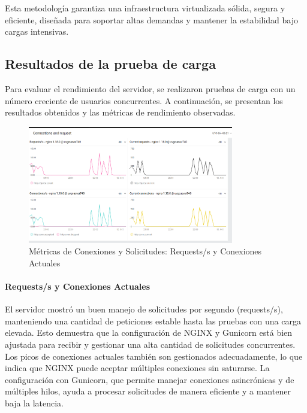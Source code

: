 Esta metodología garantiza una infraestructura virtualizada sólida, segura y eficiente, diseñada para soportar altas demandas y mantener la estabilidad bajo cargas intensivas.

\subsection{Resultados de la prueba de carga}

Para evaluar el rendimiento del servidor, se realizaron pruebas de carga con un número creciente de usuarios concurrentes. A continuación, se presentan los resultados obtenidos y las métricas de rendimiento observadas.

\begin{figure}[H]
    \centering
    \includegraphics[width=0.8\textwidth]{figuras/ConnectionsAndRequest.png}
    \caption{Métricas de Conexiones y Solicitudes: Requests/s y Conexiones Actuales}
    \label{fig:connectionsAndRequest}
\end{figure}

\paragraph{Requests/s y Conexiones Actuales}
El servidor mostró un buen manejo de solicitudes por segundo (requests/s), manteniendo una cantidad de peticiones estable hasta las pruebas con una carga elevada. Esto demuestra que la configuración de NGINX y Gunicorn está bien ajustada para recibir y gestionar una alta cantidad de solicitudes concurrentes. Los picos de conexiones actuales también son gestionados adecuadamente, lo que indica que NGINX puede aceptar múltiples conexiones sin saturarse. La configuración con Gunicorn, que permite manejar conexiones asincrónicas y de múltiples hilos, ayuda a procesar solicitudes de manera eficiente y a mantener baja la latencia.

